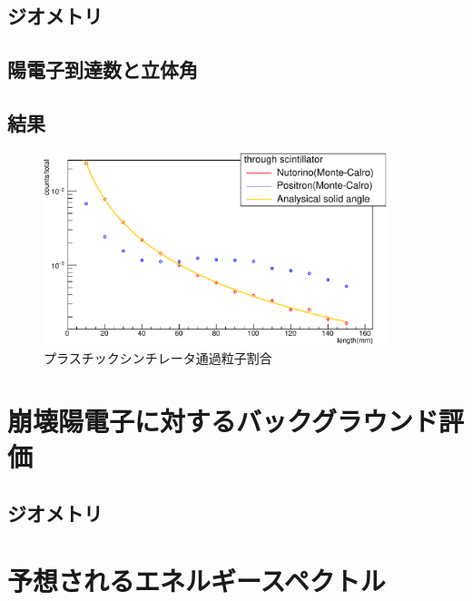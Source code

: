 \subsection{ジオメトリ}

\subsection{陽電子到達数と立体角}

\subsection{結果}

\begin{figure}[htbp]
	\centering
		\includegraphics[width=10cm]{fig/scinti_test.pdf}
	\caption{プラスチックシンチレータ通過粒子割合}
	\label{scinti_test}
\end{figure}

\section{崩壊陽電子に対するバックグラウンド評価}

\subsection{ジオメトリ}

\section{予想されるエネルギースペクトル}

